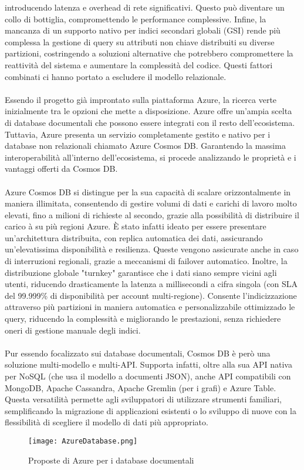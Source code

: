 introducendo latenza e overhead di rete significativi. 
Questo può diventare un collo di bottiglia, compromettendo le performance complessive. 
Infine, la mancanza di un supporto nativo per indici secondari globali (GSI) 
rende più complessa la gestione di query su attributi non chiave distribuiti su diverse partizioni, 
costringendo a soluzioni alternative che potrebbero compromettere 
la reattività del sistema e aumentare la complessità del codice. 
Questi fattori combinati ci hanno portato a escludere il modello relazionale.\\
\\
Essendo il progetto già improntato sulla piattaforma Azure,
la ricerca verte inizialmente tra le opzioni che mette a disposizione.
Azure offre un’ampia scelta di database documentali che possono essere integrati con il resto dell’ecosistema. 
Tuttavia, Azure presenta un servizio completamente gestito e nativo
per i database non relazionali chiamato Azure Cosmos DB.
Garantendo la massima interoperabilità all'interno dell'ecosistema,
si procede analizzando le proprietà e i vantaggi offerti da Cosmos DB.\\
\\
Azure Cosmos DB si distingue per la sua capacità di scalare orizzontalmente in maniera illimitata, 
consentendo di gestire volumi di dati e carichi di lavoro molto elevati, 
fino a milioni di richieste al secondo, 
grazie alla possibilità di distribuire il carico à su più regioni Azure. 
È stato infatti ideato per essere presentare un'architettura distribuita, 
con replica automatica dei dati, 
assicurando un'elevatissima disponibilità e resilienza. 
Queste vengono assicurate anche in caso di interruzioni regionali, 
grazie a meccanismi di failover automatico.
Inoltre, la distribuzione globale "turnkey" garantisce che i dati siano sempre vicini agli utenti, 
riducendo drasticamente la latenza a millisecondi a cifra singola 
(con SLA del 99.999\% di disponibilità per account multi-regione).
Consente l'indicizzazione attraverso più partizioni in maniera 
automatica e personalizzabile ottimizzado le query, 
riducendo la complessità e migliorando le prestazioni, 
senza richiedere oneri di gestione manuale degli indici.\\
\\
Pur essendo focalizzato sui database documentali,
Cosmos DB è però una soluzione multi-modello e multi-API. 
Supporta infatti, oltre alla sua API nativa per NoSQL (che usa il modello a documenti JSON), 
anche API compatibili con MongoDB, Apache Cassandra, Apache Gremlin (per i grafi) e Azure Table. 
Questa versatilità permette agli sviluppatori di utilizzare strumenti familiari, 
semplificando la migrazione di applicazioni esistenti o 
lo sviluppo di nuove con la flessibilità di scegliere il modello di dati più appropriato.\\
\begin{figure}[h!]
    \centering
    \texttt{[image: AzureDatabase.png]}
    \caption{Proposte di Azure per i database documentali}
\end{figure}


